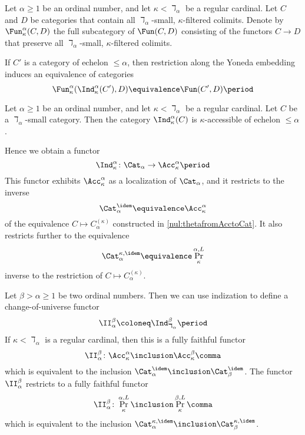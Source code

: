\begin{nul}
	Let $ \alpha \geq 1 $ be an ordinal number, and
	let $ \kappa < \daleth_{\alpha} $ be a regular cardinal.
	Let $ C $ and $ D $  be categories
	that contain all $ \daleth_{\alpha} $-small, $ \kappa $-filtered colimits.
	Denote by $ \Fun_{\kappa}^{\alpha}(C, D) $
	the full subcategory of $ \Fun(C,D) $ consisting of
	the functors $ C \to D $ that preserve all 
	$ \daleth_{\alpha} $-small, $ \kappa $-filtered colimits.
	
	If $ C' $ is a category of echelon $ \leq \alpha $,
	then restriction along the Yoneda embedding
	induces an equivalence of categories
	\[
		\Fun_{\kappa}^{\alpha}(\Ind_{\kappa}^{\alpha}(C'), D)
		\equivalence \Fun(C', D) \period
	\]
\end{nul}

\begin{eg}
	Let $ \alpha \geq 1 $ be an ordinal number, and
	let $ \kappa < \daleth_{\alpha} $ be a regular cardinal.
	Let $ C $ be a $ \daleth_{\alpha} $-small category.
	Then the category $ \Ind_{\kappa}^{\alpha}(C) $ is
	$ \kappa $-accessible of echelon $ \leq \alpha $.
	
	Hence we obtain a functor
	\[
		\Ind_{\kappa}^{\alpha} \colon
		\Cat_{\alpha} \to \Acc_{\kappa}^{\alpha} \period
	\]
	This functor exhibits $ \Acc_{\kappa}^{\alpha} $ as
	a localization of $ \Cat_{\alpha} $,
	and it restricts to the inverse
	\[ \Cat_{\alpha}^{\idem} \equivalence \Acc_{\kappa}^{\alpha} \]
	of the equivalence $ C \mapsto C_{\alpha}^{(\kappa)} $
	constructed in \eqref{nul:thetafromAcctoCat}.
	It also restricts further to the equivalence
	\[
		\Cat_{\alpha}^{\kappa,\idem} \equivalence
		\Pr^{\alpha,L}_{\kappa}
	\]
	inverse to the restriction of
	$ C \mapsto C_{\alpha}^{(\kappa)} $.
\end{eg}

\begin{construction}
	Let $ \beta > \alpha \geq 1 $ be two ordinal numbers.
	Then we can use indization to define 
	a change-of-universe functor
	\[
		\II_{\alpha}^{\beta} \coloneq
		\Ind_{\daleth_{\alpha}}^{\beta} \period
	\]
	If $ \kappa < \daleth_{\alpha} $ is a regular cardinal,
	then this is a fully faithful functor
	\[
		\II_{\alpha}^{\beta} \colon
		\Acc_{\kappa}^{\alpha} \inclusion
		\Acc_{\kappa}^{\beta} \comma
	\]
	which is equivalent to the inclusion
	$ \Cat_{\alpha}^{\idem} \inclusion \Cat_{\beta}^{\idem} $.
	The functor $ \II_{\alpha}^{\beta} $ restricts to 
	a fully faithful functor
	\[
		\II_{\alpha}^{\beta} \colon
		\Pr^{\alpha,L}_{\kappa} \inclusion
		\Pr^{\beta,L}_{\kappa} \comma
	\]
	which is equivalent to the inclusion
	$ \Cat_{\alpha}^{\kappa,\idem} \inclusion \Cat_{\beta}^{\kappa,\idem} $.
\end{construction}

